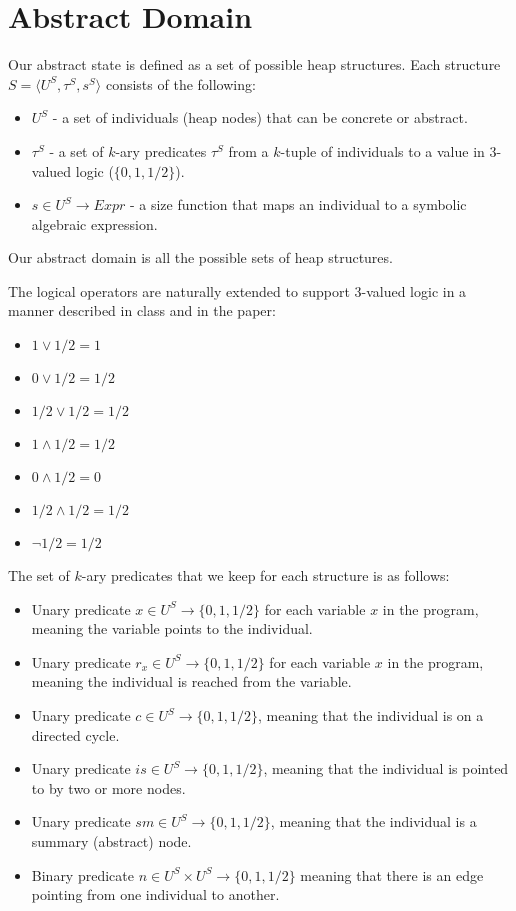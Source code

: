 \section*{Abstract Domain}
Our abstract state is defined as a set of possible heap structures. Each structure $S = \langle U^S,\tau^S,s^S\rangle$ consists of the following:
\begin{itemize}
	\item $U^S$ - a set of individuals (heap nodes) that can be concrete or abstract.
	\item $\tau^S$ - a set of $k$-ary predicates $\tau^S$ from a $k$-tuple of individuals to a value in 3-valued logic ($\{0,1,1/2\}$).
	\item $s\in U^S\to Expr$ - a size function that maps an individual to a symbolic algebraic expression.

\end{itemize}
Our abstract domain is all the possible sets of heap structures.

The logical operators are naturally extended to support 3-valued logic in a manner described in class and in the paper:
\begin{itemize}
	\item $1 \lor 1/2 = 1$
	\item $0 \lor 1/2 = 1/2$
	\item $1/2 \lor 1/2 = 1/2$
	\item $1 \land 1/2 = 1/2$
	\item $0 \land 1/2 = 0$
	\item $1/2 \land 1/2 = 1/2$
	\item $\neg 1/2 = 1/2$
\end{itemize}

The set of $k$-ary predicates that we keep for each structure is as follows:
\begin{itemize}
	\item Unary predicate $x\in U^S\to \{0,1,1/2\}$ for each variable $x$ in the program, meaning the variable points to the individual.
	\item Unary predicate $r_x\in U^S\to \{0,1,1/2\}$ for each variable $x$ in the program, meaning the individual is reached from the variable.
	\item Unary predicate $c\in U^S\to \{0,1,1/2\}$, meaning that the individual is on a directed cycle.
	\item Unary predicate $is\in U^S\to \{0,1,1/2\}$, meaning that the individual is pointed to by two or more nodes.
	\item Unary predicate $sm\in U^S\to \{0,1,1/2\}$, meaning that the individual is a summary (abstract) node.
	\item Binary predicate $n\in U^S\times U^S\to \{0,1,1/2\}$ meaning that there is an edge pointing from one individual to another.
\end{itemize}

